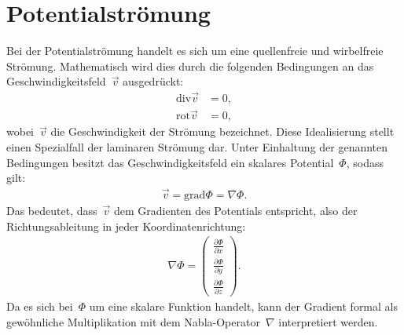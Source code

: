%
%
%
%
\section{Potentialströmung\label{ueberschall:section:potentialstroemung}}
Bei der Potentialströmung handelt es sich um eine 
quellenfreie und wirbelfreie Strömung.
Mathematisch wird dies durch die folgenden Bedingungen 
an das Geschwindigkeitsfeld~$\vec{v}$ ausgedrückt:
\begin{align*}
    \mathrm{div} \vec{v} &= 0, \\
    \mathrm{rot} \vec{v} &= 0,
\end{align*}
wobei~$\vec{v}$ die Geschwindigkeit der Strömung bezeichnet.
Diese Idealisierung stellt einen Spezialfall der
laminaren Strömung dar. 
Unter Einhaltung der genannten Bedingungen 
besitzt das Geschwindigkeitsfeld ein skalares
Potential~$\Phi$, sodass gilt:
\begin{align}
    \vec{v} 
    = 
    \mathrm{grad} \Phi 
    = 
    \nabla \Phi.\label{eq:potential}
\end{align}
Das bedeutet, dass~$\vec{v}$ dem Gradienten des Potentials 
entspricht, also der Richtungsableitung in jeder 
Koordinatenrichtung:
\begin{align*}
    \nabla \Phi =
    \begin{pmatrix}
        \frac{\partial \Phi}{\partial x} \\
        \frac{\partial \Phi}{\partial y} \\
        \frac{\partial \Phi}{\partial z}
    \end{pmatrix}.
\end{align*}
Da es sich bei~$\Phi$ um eine skalare Funktion handelt, 
kann der Gradient formal als gewöhnliche Multiplikation 
mit dem Nabla-Operator~$\nabla$ interpretiert werden.

